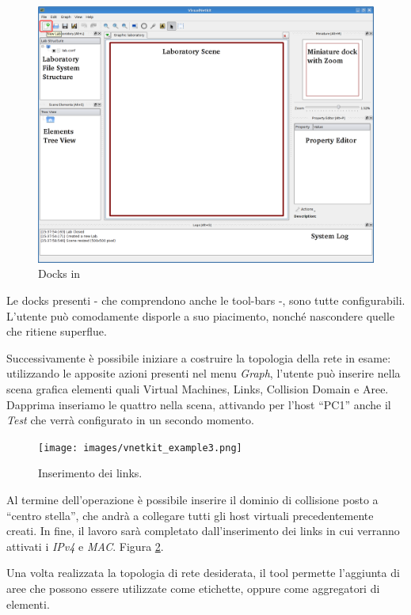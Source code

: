 \begin{figure}[!htb]
	\centering
	\includegraphics[width=12.5cm]{images/vnetkit_example1.png}
	\caption{Docks in \visualnetkit{}}
	\label{figura:vn_ex_dock}
\end{figure}

Le docks presenti - che comprendono anche le tool-bars -, sono tutte configurabili. L'utente può comodamente disporle a suo piacimento, nonché nascondere quelle che ritiene superflue.

Successivamente è possibile iniziare a costruire la topologia della rete in esame: utilizzando le apposite azioni presenti nel menu \emph{Graph}, l'utente può inserire nella scena grafica elementi quali Virtual Machines, Links, Collision Domain e Aree. Dapprima inseriamo le quattro \virtualmachine{} nella scena, attivando per l'host ``PC1'' anche il \plugin{} \emph{Test} che verrà configurato in un secondo momento.

\begin{figure}[!htb]
	\centering
	\texttt{[image: images/vnetkit\_example3.png]}
	\caption{Inserimento dei links.}
	\label{figura:vn_ex_links}
\end{figure}

Al termine dell'operazione è possibile inserire il dominio di collisione posto a ``centro stella'', che andrà a collegare tutti gli host virtuali precedentemente creati. In fine, il lavoro sarà completato dall'inserimento dei links in cui verranno attivati i \plugin{} \emph{IPv4} e \emph{MAC}. Figura \ref{figura:vn_ex_links}.

Una volta realizzata la topologia di rete desiderata, il tool permette l'aggiunta di aree che possono essere utilizzate come etichette, oppure come aggregatori di elementi.

